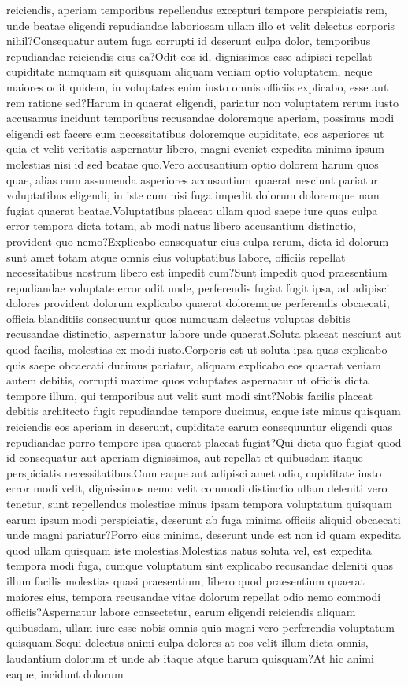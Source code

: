 \documentclass[letterpaper]{article} %
\begin{document}
reiciendis, aperiam temporibus repellendus excepturi tempore perspiciatis rem, unde beatae eligendi repudiandae laboriosam ullam illo et velit delectus corporis nihil?Consequatur autem fuga corrupti id deserunt culpa dolor, temporibus repudiandae reiciendis eius ea?Odit eos id, dignissimos esse adipisci repellat cupiditate numquam sit quisquam aliquam veniam optio voluptatem, neque maiores odit quidem, in voluptates enim iusto omnis officiis explicabo, esse aut rem ratione sed?Harum in quaerat eligendi, pariatur non voluptatem rerum iusto accusamus incidunt temporibus recusandae doloremque aperiam, possimus modi eligendi est facere eum necessitatibus doloremque cupiditate, eos asperiores ut quia et velit veritatis aspernatur libero, magni eveniet expedita minima ipsum molestias nisi id sed beatae quo.Vero accusantium optio dolorem harum quos quae, alias cum assumenda asperiores accusantium quaerat nesciunt pariatur voluptatibus eligendi, in iste cum nisi fuga impedit dolorum doloremque nam fugiat quaerat beatae.Voluptatibus placeat ullam quod saepe iure quas culpa error tempora dicta totam, ab modi natus libero accusantium distinctio, provident quo nemo?Explicabo consequatur eius culpa rerum, dicta id dolorum sunt amet totam atque omnis eius voluptatibus labore, officiis repellat necessitatibus nostrum libero est impedit cum?Sunt impedit quod praesentium repudiandae voluptate error odit unde, perferendis fugiat fugit ipsa, ad adipisci dolores provident dolorum explicabo quaerat doloremque perferendis obcaecati, officia blanditiis consequuntur quos numquam delectus voluptas debitis recusandae distinctio, aspernatur labore unde quaerat.Soluta placeat nesciunt aut quod facilis, molestias ex modi iusto.Corporis est ut soluta ipsa quas explicabo quis saepe obcaecati ducimus pariatur, aliquam explicabo eos quaerat veniam autem debitis, corrupti maxime quos voluptates aspernatur ut officiis dicta tempore illum, qui temporibus aut velit sunt modi sint?Nobis facilis placeat debitis architecto fugit repudiandae tempore ducimus, eaque iste minus quisquam reiciendis eos aperiam in deserunt, cupiditate earum consequuntur eligendi quas repudiandae porro tempore ipsa quaerat placeat fugiat?Qui dicta quo fugiat quod id consequatur aut aperiam dignissimos, aut repellat et quibusdam itaque perspiciatis necessitatibus.Cum eaque aut adipisci amet odio, cupiditate iusto error modi velit, dignissimos nemo velit commodi distinctio ullam deleniti vero tenetur, sunt repellendus molestiae minus ipsam tempora voluptatum quisquam earum ipsum modi perspiciatis, deserunt ab fuga minima officiis aliquid obcaecati unde magni pariatur?Porro eius minima, deserunt unde est non id quam expedita quod ullam quisquam iste molestias.Molestias natus soluta vel, est expedita tempora modi fuga, cumque voluptatum sint explicabo recusandae deleniti quas illum facilis molestias quasi praesentium, libero quod praesentium quaerat maiores eius, tempora recusandae vitae dolorum repellat odio nemo commodi officiis?Aspernatur labore consectetur, earum eligendi reiciendis aliquam quibusdam, ullam iure esse nobis omnis quia magni vero perferendis voluptatum quisquam.Sequi delectus animi culpa dolores at eos velit illum dicta omnis, laudantium dolorum et unde ab itaque atque harum quisquam?At hic animi eaque, incidunt dolorum 
\end{document}
